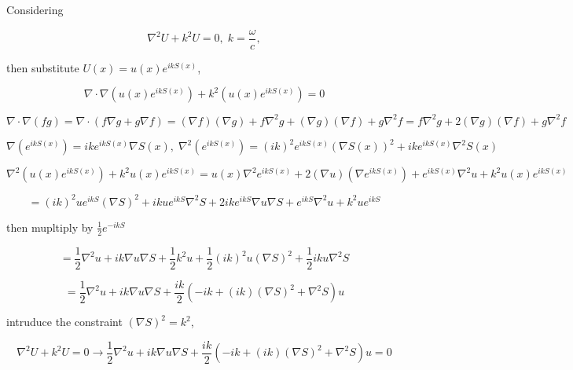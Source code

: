 \documentclass[12pt]{article}
\newcommand{\rarw}[0] { \rightarrow }
\newcommand{\om}[0] { \omega }
\newcommand{ \Del } { \nabla }
\begin{document}
Considering

$$
\Del^2 U + k^2 U = 0, \; k = \frac{\om}{c}, 
$$

then substitute $U(x) = u(x) e^{i k S(x) }$,

$$
\Del \cdot \Del \left(  u(x) e^{i k S(x)} \right) + k^2 \left(  u(x) e^{i k S(x)} \right) = 0
$$

$$
\Del \cdot \Del (f g) = \Del \cdot \left( f \Del g   +  g \Del f \right) = (\Del f ) ( \Del g ) + f \Del^2 g + (\Del g) ( \Del f ) + g \Del^2 f =  f \Del^2 g + 2 (\Del g) ( \Del f ) + g \Del^2 f
$$


$$
\Del ( e^{i k S(x) } ) = i k e^{i k S(x)} \Del S(x) , \;  \Del^2( e^{i k S(x) }  ) =  (i k)^2  e^{i k S(x)}  (\Del S(x))^2  + i k e^{i k S(x)} \Del^2 S(x)
$$


$$
\Del ^2 \left(  u(x) e^{i k S(x)} \right) + k^2   u(x) e^{i k S(x)}  = 
u(x) \Del^2  e^{i k S(x)} + 2 (\Del u) ( \Del  e^{i k S(x)} ) +  e^{i k S(x)} \Del^2 u  +  k^2 u(x) e^{i k S(x)}
$$


$$
=  (i k)^2 u e^{i k S}  ( \Del S)^2  + i k u e^{i k S} \Del^2 S + 2 i k e^{i k S}  \Del u \Del S  +  e^{i k S} \Del^2 u  + k^2 u  e^{i k S}  
$$

then mupltiply by $ \frac{1}{2} e^{ - i k S} $ 

$$
=   \frac{1}{2}  \Del^2 u  + i k   \Del u \Del S  + \frac{1}{2}  k^2 u  +  \frac{1}{2} (i k)^2 u  (\Del S)^2  + \frac{1}{2} i k u  \Del^2 S 
$$

$$
=   \frac{1}{2}  \Del^2 u  + i k   \Del u \Del S  + \frac{ik}{2} \left( -ik  +  (ik) ( \Del S)^2  +   \Del^2 S \right) u
$$

intruduce the constraint $(\Del S)^2 = k^2$, 

$$
\Del^2 U + k^2 U = 0 \rarw  \frac{1}{2}  \Del^2 u  + i k   \Del u \Del S  + \frac{ik}{2} \left( -ik  +  (ik) ( \Del S)^2  +   \Del^2 S \right) u = 0
$$
\end{document}
